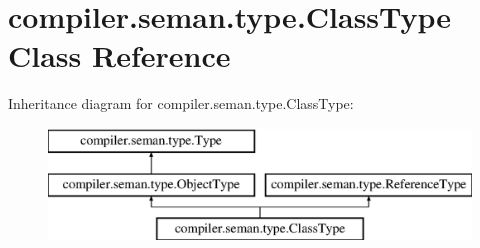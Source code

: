 \hypertarget{classcompiler_1_1seman_1_1type_1_1_class_type}{}\section{compiler.\+seman.\+type.\+Class\+Type Class Reference}
\label{classcompiler_1_1seman_1_1type_1_1_class_type}
Inheritance diagram for compiler.\+seman.\+type.\+Class\+Type\+:\begin{figure}[H]
\begin{center}
\leavevmode
\includegraphics[height=3.000000cm]{classcompiler_1_1seman_1_1type_1_1_class_type}
\end{center}
\end{figure}
